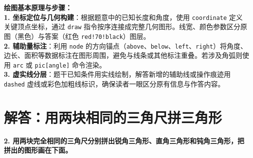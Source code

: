 \vspace{0.8cm}


\vspace{0.6cm}

{\small\color{blue!70!black}
\textbf{绘图基本原理与步骤：}\\
\textbf{1. 坐标定位与几何构建}：根据题意中的已知长度和角度，使用 \texttt{coordinate} 定义关键顶点坐标，通过 \texttt{draw} 指令按序连接成完整几何图形。线宽、颜色参数区分原图（黑色）与答案（红色 \texttt{red!70!black}）图层。\\
\textbf{2. 辅助量标注}：利用 \texttt{node} 的方向锚点（\texttt{above}、\texttt{below}、\texttt{left}、\texttt{right}）将角度、边长、面积等数据标注在图形周围，避免与线条或其他标注重叠。若涉及角弧则使用 \texttt{arc} 或 \texttt{pic[angle]} 命令渲染。\\
\textbf{3. 虚实线分层}：题干已知条件用实线绘制，解答新增的辅助线或操作痕迹用 \texttt{dashed} 虚线或彩色加粗线标识，确保读者一眼区分原有信息与作答内容。
}

\newpage



\newpage

\section{解答：用两块相同的三角尺拼三角形}

\vspace{0.4cm}

\noindent\textbf{2. 用两块完全相同的三角尺分别拼出锐角三角形、直角三角形和钝角三角形，把拼出的图形画在下面。}

\vspace{0.8cm}

